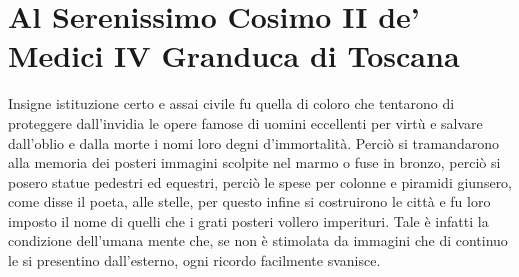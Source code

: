 \documentclass[11pt,twoside,openany]{book}
\begin{document}
\chapter*{Al Serenissimo Cosimo II de' Medici IV Granduca di Toscana}

Insigne istituzione certo e assai civile fu quella di coloro che tentarono di proteggere dall'invidia le opere famose di uomini eccellenti per virtù e salvare dall'oblio e dalla morte i nomi loro degni d'immortalità. Perciò si tramandarono alla memoria dei posteri immagini scolpite nel marmo o fuse in bronzo, perciò si posero statue pedestri ed equestri, perciò le spese per colonne e piramidi giunsero, come disse il poeta, alle stelle, per questo infine si costruirono le città e fu loro imposto il nome di quelli che i grati posteri vollero imperituri. Tale è infatti la condizione dell'umana mente che, se non è stimolata da immagini che di continuo le si presentino dall'esterno, ogni ricordo facilmente svanisce.
\end{document}
